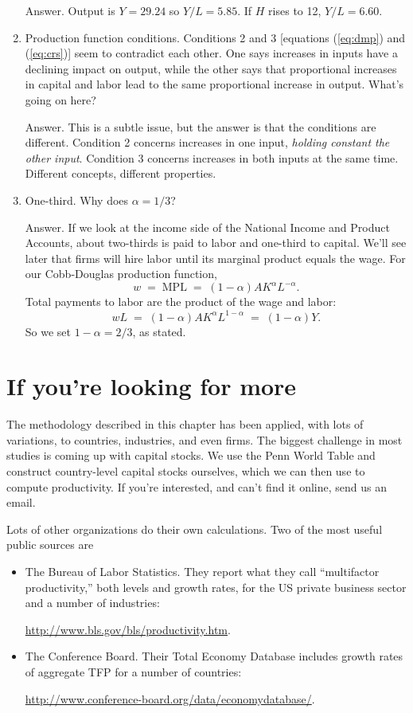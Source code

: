 \begin{enumerate}
Answer.  Output is $Y = 29.24$ so $Y/L = 5.85$.  If $H$ rises to 12,
$Y/L = 6.60 $.

\item Production function conditions.
Conditions 2 and 3 [equations (\ref{eq:dmp}) and (\ref{eq:crs})]
seem to contradict each other.
One says increases in inputs have a declining impact on output, while
the other says that proportional increases in capital and labor
lead to the same proportional increase in output.  What's going on here?

Answer.  This is a subtle issue, but the answer is that
the conditions are different.
Condition 2 concerns increases in one input,
{\it holding constant the other input\/}.
Condition 3 concerns increases in both inputs at the same time.
Different concepts, different properties.

\item One-third.  Why does $\alpha=1/3$?

Answer.  If we look at the income side of the National Income
and Product Accounts, about two-thirds is paid to labor
and one-third to capital.
We'll see later that firms will hire labor until its
marginal product equals the wage.
For our Cobb-Douglas production function,
\[
    w \;=\; \mbox{MPL} \;=\; (1-\alpha) A K^\alpha L^{-\alpha} .
\]
Total payments to labor are the product of the wage and labor:
\[
    w L  \;=\; (1-\alpha) A K^\alpha L^{1-\alpha} \;=\; (1-\alpha) Y.
\]
So we set $1-\alpha = 2/3$, as stated.
\end{enumerate}
\setlength{\leftmargini}{\oldleftmargini}

\section*{If you're looking for more}

The methodology described in this chapter has been applied,
with lots of variations,
to countries, industries, and even firms.
The biggest challenge in most studies is coming up with capital stocks.
We use the Penn World Table and construct country-level capital stocks ourselves,
which we can then use to compute productivity.
If you're interested, and can't find it online, send us an email.

Lots of other organizations do their own calculations.
Two of the most useful public sources are
\begin{itemize}
\item The Bureau of Labor Statistics.
They  report what they call
``multifactor productivity,'' both levels and growth rates,
for the US private business sector and a number of industries:

\vspace*{\parskip}
\centerline{\url{http://www.bls.gov/bls/productivity.htm}.}

\item The Conference Board.  Their Total Economy Database includes
growth rates of aggregate TFP for a number of countries:

\vspace*{\parskip}
\centerline{\phantom{xxxxx}\url{http://www.conference-board.org/data/economydatabase/}.}
\end{itemize}

